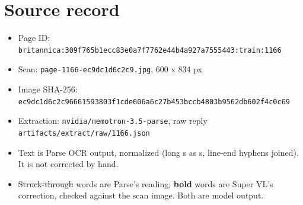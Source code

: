 \documentclass[10pt]{article}
\begin{document}
\section*{Source record}
\begin{itemize}
\item Page ID: \texttt{britannica:309f765b1ecc83e0a7f7762e44b4a927a7555443:train:1166}
\item Scan: \texttt{page-1166-ec9dc1d6c2c9.jpg}, 600 x 834 px
\item Image SHA-256: \texttt{\small ec9dc1d6c2c96661593803f1cde606a6c27b453bccb4803b9562db602f4c0c69}
\item Extraction: \texttt{nvidia/nemotron-3.5-parse}, raw reply \texttt{artifacts/extract/raw/1166.json}
\item Text is Parse OCR output, normalized (long s as s, line-end hyphens joined). It is not corrected by hand.
\item \sout{Struck-through} words are Parse's reading; \textbf{bold} words are Super VL's correction, checked against the scan image. Both are model output.
\end{itemize}
\end{document}
